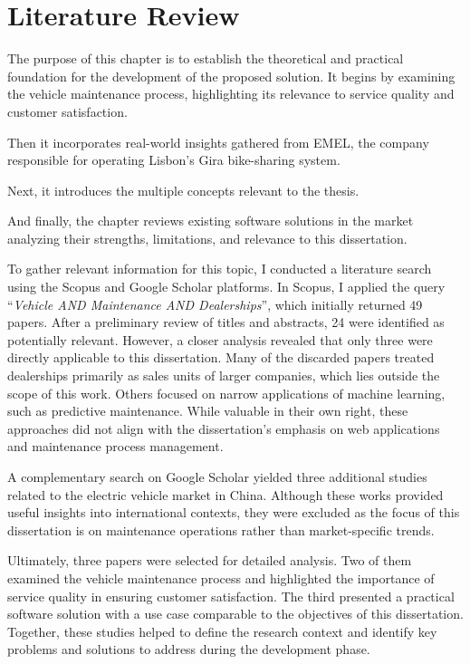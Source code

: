 \chapter{Literature Review}%
\label{chapter:literatureReview}

\begin{introduction}
The purpose of this chapter is to establish the theoretical and practical foundation for the development of the proposed solution. It begins by examining the vehicle maintenance process, highlighting its relevance to service quality and customer satisfaction. 

Then it incorporates real-world insights gathered from EMEL, the company responsible for operating Lisbon's Gira bike-sharing system. 

Next, it introduces the multiple concepts relevant to the thesis.

And finally, the chapter reviews existing software solutions in the market analyzing their strengths, limitations, and relevance to this dissertation.
\end{introduction} 

To gather relevant information for this topic, I conducted a literature search using the Scopus and Google Scholar platforms. In Scopus, I applied the query “\textit{Vehicle AND Maintenance AND Dealerships}”, which initially returned 49 papers. After a preliminary review of titles and abstracts, 24 were identified as potentially relevant. However, a closer analysis revealed that only three were directly applicable to this dissertation. Many of the discarded papers treated dealerships primarily as sales units of larger companies, which lies outside the scope of this work. Others focused on narrow applications of machine learning, such as predictive maintenance. While valuable in their own right, these approaches did not align with the dissertation's emphasis on web applications and maintenance process management.

A complementary search on Google Scholar yielded three additional studies related to the electric vehicle market in China. Although these works provided useful insights into international contexts, they were excluded as the focus of this dissertation is on maintenance operations rather than market-specific trends.

Ultimately, three papers were selected for detailed analysis. Two of them examined the vehicle maintenance process and highlighted the importance of service quality in ensuring customer satisfaction. The third presented a practical software solution with a use case comparable to the objectives of this dissertation. Together, these studies helped to define the research context and identify key problems and solutions to address during the development phase.

